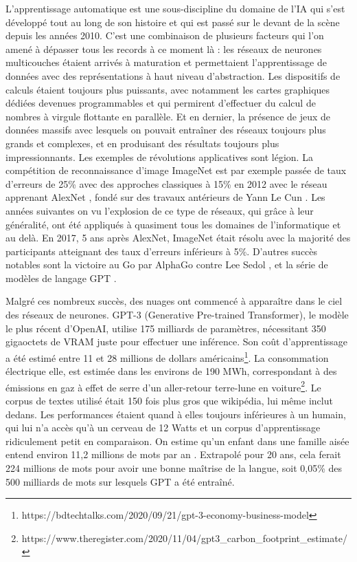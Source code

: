 	L'apprentissage automatique est une sous-discipline du domaine de l'IA qui s'est développé tout au long de son histoire et qui est passé sur le devant de la scène depuis les années 2010. C'est une combinaison de plusieurs facteurs qui l'on amené à dépasser tous les records à ce moment là : les réseaux de neurones multicouches étaient arrivés à maturation et permettaient l'apprentissage de données avec des représentations à haut niveau d'abstraction. Les dispositifs de calculs étaient toujours plus puissants, avec notamment les cartes graphiques dédiées devenues programmables et qui permirent d'effectuer du calcul de nombres à virgule flottante en parallèle. Et en dernier, la présence de jeux de données massifs avec lesquels on pouvait entraîner des réseaux toujours plus grands et complexes, et en produisant des résultats toujours plus impressionnants. Les exemples de révolutions applicatives sont légion. La compétition de reconnaissance d'image ImageNet est par exemple passée de taux d'erreurs de 25\% avec des approches classiques à 15\% en 2012 avec le réseau apprenant AlexNet \cite{krizhevsky2012imagenet}, fondé sur des travaux antérieurs de Yann Le Cun \cite{lecun1989backpropagation}. Les années suivantes on vu l'explosion de ce type de réseaux, qui grâce à leur généralité, ont été appliqués à quasiment tous les domaines de l'informatique et au delà. En 2017, 5 ans après AlexNet, ImageNet était résolu avec la majorité des participants atteignant des taux d'erreurs inférieurs à 5\%. D'autres succès notables sont la victoire au Go par AlphaGo contre Lee Sedol \cite{silver2016mastering}, et la série de modèles de langage GPT \cite{brown2020language}.

	Malgré ces nombreux succès, des nuages ont commencé à apparaître dans le ciel des réseaux de neurones. GPT-3 (Generative Pre-trained Transformer), le modèle le plus récent d'OpenAI, utilise 175 milliards de paramètres, nécessitant 350 gigaoctets de VRAM juste pour effectuer une inférence. Son coût d'apprentissage a été estimé entre 11 et 28 millions de dollars américains\footnote{https://bdtechtalks.com/2020/09/21/gpt-3-economy-business-model}. La consommation électrique elle, est estimée dans les environs de 190 MWh, correspondant à des émissions en gaz à effet de serre d'un aller-retour terre-lune en voiture\footnote{https://www.theregister.com/2020/11/04/gpt3\_carbon\_footprint\_estimate/}. Le corpus de textes utilisé était 150 fois plus gros que wikipédia, lui même inclut dedans. Les performances étaient quand à elles toujours inférieures à un humain, qui lui n'a accès qu'à un cerveau de 12 Watts et un corpus d'apprentissage ridiculement petit en comparaison. On estime qu'un enfant dans une famille aisée entend environ 11,2 millions de mots par an \cite{hart2003early}. Extrapolé pour 20 ans, cela ferait 224 millions de mots pour avoir une bonne maîtrise de la langue, soit 0,05\% des 500 milliards de mots sur lesquels GPT a été entraîné.

